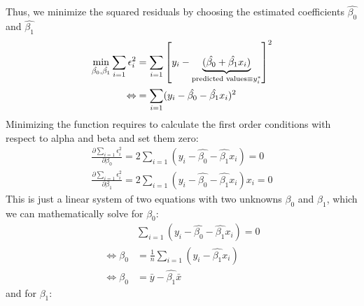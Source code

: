 \documentclass[
  12pt,
  oneside]{book}
\theoremstyle{definition}
\theoremstyle{definition}
\theoremstyle{definition}
\theoremstyle{definition}
\theoremstyle{remark}
\begin{document}
Thus, we minimize the squared residuals by choosing the estimated coefficients \(\hat{\beta_{0}}\) and \(\hat{\beta_{1}}\)
\begin{align*}
\min_{\hat{\beta_{0}}, \hat{\beta_{1}}}\sum_{i=1} \epsilon_i^2 &= \sum_{i=1}    \left[y_i - \underbrace{(\hat{\beta_{0}} + \hat{\beta_{1}} x_i)}_{\textnormal{predicted values}\equiv y_i^*}\right]^2\\
\Leftrightarrow  &=  \sum_{i=1} (y_i - \hat{\beta_{0}} - \hat{\beta_{1}} x_i)^2
\end{align*}
Minimizing the function requires to calculate the first order conditions with respect to alpha and beta and set them zero:
\begin{align*}
\frac{\partial \sum_{i=1} \epsilon_i^2}{\partial \beta_{0}}=2 \sum_{i=1}    (y_i - \hat{\beta_{0}} - \hat{\beta_{1}} x_i)=0\\
\frac{\partial \sum_{i=1} \epsilon_i^2}{\partial \beta_{1}}=2 \sum_{i=1}    (y_i - \hat{\beta_{0}} - \hat{\beta_{1}} x_i)x_i=0
\end{align*}
This is just a linear system of two equations with two unknowns \(\beta_{0}\) and \(\beta_{1}\), which we can mathematically solve for \(\beta_0\):
\begin{align*}
    &\sum_{i=1} (y_i - \hat{\beta_{0}} - \hat{\beta_{1}} x_i)=0\\
    \Leftrightarrow \hat{\beta_{0}}&=\frac{1}{n}\sum_{i=1}  (y_i  - \hat{\beta_{1}} x_i)\\
    \Leftrightarrow \hat{\beta_{0}}&=\bar{y}-\hat{\beta_{1}}\bar{x}
\end{align*}
and for \(\beta_{1}\):
\end{document}
